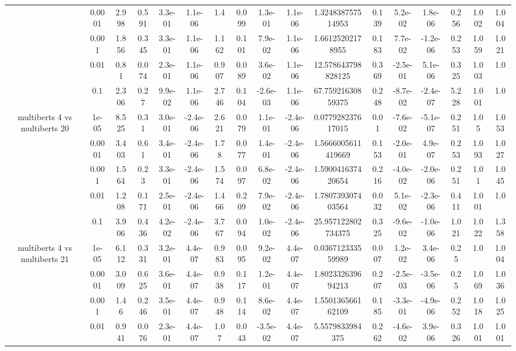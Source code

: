 \begin{tabular}{|c|c|c|c|c|c|c|c|c|c|c|c|c|c|c|c|c|}
 & 0.0001 & 2.998 & 0.591 & 3.3e-01 & 1.1e-06 & 1.4 & 0.099 & 1.3e-01 & 1.1e-06 & 1.324838757514953 & 0.139 & 5.2e-02 & 1.8e-06 & 0.256 & 1.002 & 1.004 \\
 & 0.001 & 1.856 & 0.345 & 3.3e-01 & 1.1e-06 & 1.162 & 0.101 & 7.9e-02 & 1.1e-06 & 1.66125202178955 & 0.183 & 7.7e-02 & -1.2e-06 & 0.253 & 1.059 & 1.021 \\
 & 0.01 & 0.81 & 0.074 & 2.3e-01 & 1.1e-06 & 0.907 & 0.089 & 3.6e-02 & 1.1e-06 & 12.578643798828125 & 0.369 & -2.5e-01 & 5.1e-06 & 0.325 & 1.003 & 1.0 \\
 & 0.1 & 2.306 & 0.27 & 9.9e-02 & 1.1e-06 & 2.746 & 0.104 & -2.6e-03 & 1.1e-06 & 67.75921630859375 & 0.248 & -8.7e-02 & -2.4e-07 & 5.228 & 1.001 & 1.0 \\
\hline
\multirow{5}{*}{multiberts 4 vs multiberts 20} & 1e-05 & 8.525 & 0.31 & 3.0e-01 & -2.4e-06 & 2.621 & 0.079 & 1.1e-01 & -2.4e-06 & 0.077928237617015 & 0.01 & -7.6e-02 & -5.1e-07 & 0.251 & 1.05 & 1.053 \\
 & 0.0001 & 3.403 & 0.61 & 3.4e-01 & -2.4e-06 & 1.78 & 0.077 & 1.4e-01 & -2.4e-06 & 1.5666005611419669 & 0.153 & -2.0e-01 & 4.9e-07 & 0.253 & 1.093 & 1.027 \\
 & 0.001 & 1.564 & 0.23 & 3.3e-01 & -2.4e-06 & 1.574 & 0.097 & 6.8e-02 & -2.4e-06 & 1.590041637420654 & 0.216 & -4.0e-02 & -2.0e-06 & 0.251 & 1.01 & 1.045 \\
 & 0.01 & 1.208 & 0.171 & 2.5e-01 & -2.4e-06 & 1.466 & 0.209 & 7.9e-02 & -2.4e-06 & 1.780739307403564 & 0.032 & 5.1e-02 & -2.3e-06 & 0.411 & 1.001 & 1.0 \\
 & 0.1 & 3.906 & 0.436 & 4.2e-02 & -2.4e-06 & 3.767 & 0.094 & 1.0e-02 & -2.4e-06 & 25.957122802734375 & 0.325 & -9.6e-02 & -1.0e-06 & 1.021 & 1.022 & 1.358 \\
\hline
\multirow{5}{*}{multiberts 4 vs multiberts 21} & 1e-05 & 6.112 & 0.331 & 3.2e-01 & 4.4e-07 & 0.983 & 0.095 & 9.2e-02 & 4.4e-07 & 0.036712333559989 & 0.007 & 1.2e-02 & 3.4e-06 & 0.25 & 1.0 & 1.004 \\
 & 0.0001 & 3.009 & 0.625 & 3.6e-01 & 4.4e-07 & 0.938 & 0.117 & 1.2e-01 & 4.4e-07 & 1.802332639694213 & 0.207 & -2.5e-03 & -3.5e-06 & 0.25 & 1.069 & 1.036 \\
 & 0.001 & 1.46 & 0.246 & 3.5e-01 & 4.4e-07 & 0.948 & 0.114 & 8.6e-02 & 4.4e-07 & 1.550136566162109 & 0.185 & -3.3e-01 & -4.9e-06 & 0.252 & 1.018 & 1.025 \\
 & 0.01 & 0.941 & 0.076 & 2.3e-01 & 4.4e-07 & 1.07 & 0.043 & -3.5e-02 & 4.4e-07 & 5.5579833984375 & 0.262 & -4.6e-02 & 3.9e-06 & 0.326 & 1.001 & 1.001 \\

\end{tabular}
